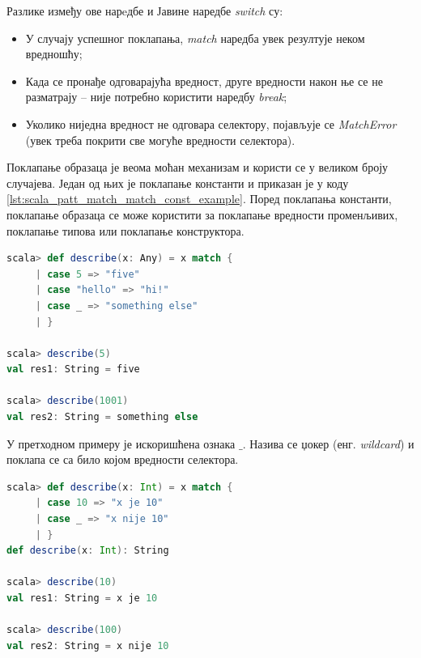\documentclass[12pt,oneside]{memoir}
\begin{document}
Разлике између ове нарeдбе и Јавине наредбе \textit{switch} су:

\begin{itemize} 
\item У случају успешног поклапања, \textit{match} наредба увек резултује неком вредношћу;
\item Када се пронађе одговарајућа вредност, друге вредности након ње се не разматрају -- није потребно користити наредбу \textit{break};
\item Уколико ниједна вредност не одговара селектору, појављује се \textit{MatchError} (увек треба покрити све могуће вредности селектора).
\end{itemize}


Поклапање образаца је веома моћан механизам и користи се у великом броју случајева. Један од њих је поклапање константи и приказан је у коду \ref{lst:scala_patt_match_match_const_example}. Поред поклапања константи, поклапање образаца се може користити за поклапање вредности променљивих, поклапање типова или поклапање конструктора.

\begin{lstlisting}[language=Scala, caption={Поклапање константи}, label={lst:scala_patt_match_match_const_example}]
scala> def describe(x: Any) = x match {
     | case 5 => "five"
     | case "hello" => "hi!"
     | case _ => "something else"
     | }
     
scala> describe(5)
val res1: String = five

scala> describe(1001)
val res2: String = something else
\end{lstlisting}

У претходном примеру је искоришћена ознака $\_$. Назива се џокер (енг. \textit{wildcard}) и поклапа се са било којом вредности селектора.

\begin{lstlisting}[language=Scala, caption={Џокер у поклапању образаца}, label={lst:scala_patt_match_wildcard}]
scala> def describe(x: Int) = x match {
     | case 10 => "x je 10"
     | case _ => "x nije 10"
     | }
def describe(x: Int): String

scala> describe(10)
val res1: String = x je 10

scala> describe(100)
val res2: String = x nije 10

\end{lstlisting}
\end{document}
